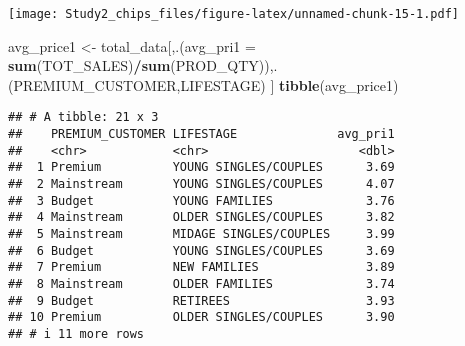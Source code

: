 \documentclass[
]{article}
\newenvironment{Shaded}{\begin{snugshade}}{\end{snugshade}}
\newcommand{\AttributeTok}[1]{\textcolor[rgb]{0.13,0.29,0.53}{#1}}
\newcommand{\DecValTok}[1]{\textcolor[rgb]{0.00,0.00,0.81}{#1}}
\newcommand{\FloatTok}[1]{\textcolor[rgb]{0.00,0.00,0.81}{#1}}
\newcommand{\FunctionTok}[1]{\textcolor[rgb]{0.13,0.29,0.53}{\textbf{#1}}}
\newcommand{\NormalTok}[1]{#1}
\newcommand{\OtherTok}[1]{\textcolor[rgb]{0.56,0.35,0.01}{#1}}
\newcommand{\SpecialCharTok}[1]{\textcolor[rgb]{0.81,0.36,0.00}{\textbf{#1}}}
\newcommand{\StringTok}[1]{\textcolor[rgb]{0.31,0.60,0.02}{#1}}
\begin{document}
\begin{Shaded}
\end{Shaded}

\texttt{[image: Study2\_chips\_files/figure-latex/unnamed-chunk-15-1.pdf]}

\begin{Shaded}
\begin{Highlighting}[]
\NormalTok{avg\_price1 }\OtherTok{\textless{}{-}}\NormalTok{ total\_data[,.(}\AttributeTok{avg\_pri1 =} \FunctionTok{sum}\NormalTok{(TOT\_SALES)}\SpecialCharTok{/}\FunctionTok{sum}\NormalTok{(PROD\_QTY)),.(PREMIUM\_CUSTOMER,LIFESTAGE) ]}
\FunctionTok{tibble}\NormalTok{(avg\_price1)}
\end{Highlighting}
\end{Shaded}

\begin{verbatim}
## # A tibble: 21 x 3
##    PREMIUM_CUSTOMER LIFESTAGE              avg_pri1
##    <chr>            <chr>                     <dbl>
##  1 Premium          YOUNG SINGLES/COUPLES      3.69
##  2 Mainstream       YOUNG SINGLES/COUPLES      4.07
##  3 Budget           YOUNG FAMILIES             3.76
##  4 Mainstream       OLDER SINGLES/COUPLES      3.82
##  5 Mainstream       MIDAGE SINGLES/COUPLES     3.99
##  6 Budget           YOUNG SINGLES/COUPLES      3.69
##  7 Premium          NEW FAMILIES               3.89
##  8 Mainstream       OLDER FAMILIES             3.74
##  9 Budget           RETIREES                   3.93
## 10 Premium          OLDER SINGLES/COUPLES      3.90
## # i 11 more rows
\end{verbatim}
\end{document}
